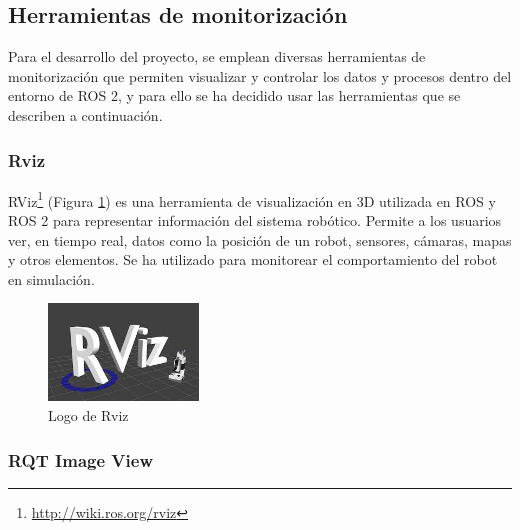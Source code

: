 
\subsection{Herramientas de monitorización}
\label{subsec:monitorización}

Para el desarrollo del proyecto, se emplean diversas herramientas de monitorización que permiten visualizar y controlar los datos y procesos dentro del entorno de ROS 2, y para ello se ha decidido usar las herramientas que se describen a continuación.

\subsubsection{Rviz}
\label{subsubsec:rviz}

RViz\footnote{\url{http://wiki.ros.org/rviz}} (Figura \ref{fig:rviz}) es una herramienta de visualización en 3D utilizada en ROS y ROS 2 para representar información del sistema robótico. Permite a los usuarios ver, en tiempo real, datos como la posición de un robot, sensores, cámaras, mapas y otros elementos. Se ha utilizado para monitorear el comportamiento del robot en simulación.\\

\begin{figure} [h!]
	\begin{center}
		\includegraphics[width=4cm]{figs/rviz.png}
	\end{center}
	\caption{Logo de Rviz} %
	\label{fig:rviz}
\end{figure}


\subsubsection{RQT Image View}
\label{subsubsec:rqtimage}

